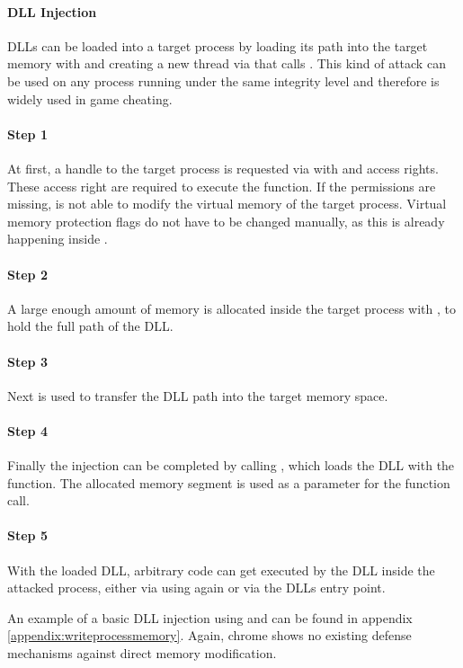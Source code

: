 \paragraph{ DLL Injection}
DLLs can be loaded into a target process by loading its path into the target memory with  and creating a new thread via  that calls . This kind of attack can be used on any process running under the same integrity level and therefore is widely used in game cheating.

\paragraph{Step 1} 
At first, a handle to the target process is requested via  with  and  access rights. These access right are required to execute the  function. If the permissions are missing,  is not able to modify the virtual memory of the target process. Virtual memory protection flags do not have to be changed manually, as this is already happening inside . 

\paragraph{Step 2} 
A large enough amount of memory is allocated inside the target process with , to hold the full path of the DLL. 

\paragraph{Step 3}
Next  is used to transfer the DLL path into the target memory space.

\paragraph{Step 4}
Finally the injection can be completed by calling , which loads the DLL with the  function. The allocated memory segment is used as a parameter for the  function call. 

\paragraph{Step 5}
With the loaded DLL, arbitrary code can get executed by the DLL inside the attacked process, either via using  again or via the DLLs entry point.


An example of a basic DLL injection using  and  can be found in appendix \ref{appendix:writeprocessmemory}. Again, chrome shows no existing defense mechanisms against direct memory modification.